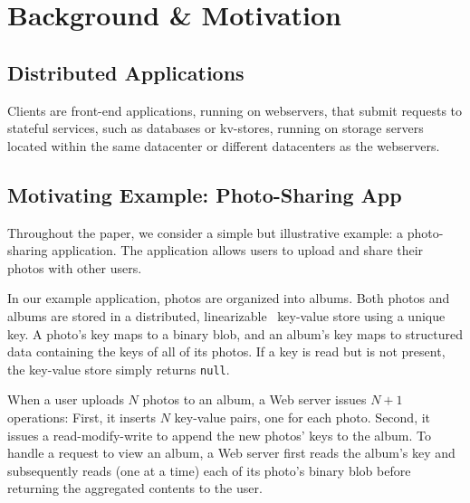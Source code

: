 \section{Background \& Motivation}

\subsection{Distributed Applications}

Clients are front-end applications, running on webservers, that submit requests to stateful services, such as databases or kv-stores, running on storage servers located within the same datacenter or different datacenters as the webservers.

\subsection{Motivating Example: Photo-Sharing App}

Throughout the paper, we consider a simple but illustrative
example: a photo-sharing application. The application allows
users to upload and share their photos with other users.

In our example application, photos are organized into
albums. Both photos and albums are stored in a distributed,
linearizable~\cite{herlihy1990linearizability} key-value store
using a unique key. A photo’s key maps to a binary blob, and
an album’s key maps to structured data containing the keys of
all of its photos. If a key is read but is not present, the
key-value store simply returns \texttt{null}.

When a user uploads $N$ photos to an album, a Web server
issues $N+1$ operations: First, it inserts $N$ key-value
pairs, one for each photo. Second, it issues a read-modify-write
to append the new photos' keys to the album. To handle a request to
view an album, a Web server first reads the album's key and subsequently
reads (one at a time) each of its photo's binary blob before
returning the aggregated contents to the user.



